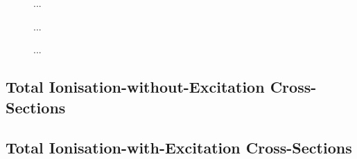 \documentclass[]{article}
\begin{document}
\begin{figure}[h]
  \begin{center}
    
  \end{center}
  \caption[...]{...}
\end{figure}

\begin{figure}[h]
  \begin{center}
    
  \end{center}
  \caption[...]{...}
\end{figure}

\begin{figure}[h]
  \begin{center}
    
  \end{center}
  \caption[...]{...}
\end{figure}


\subsection{Total Ionisation-without-Excitation Cross-Sections}
\label{sec:re-ticswout}



\subsection{Total Ionisation-with-Excitation Cross-Sections}
\label{sec:re-ticsw}




\end{document}
